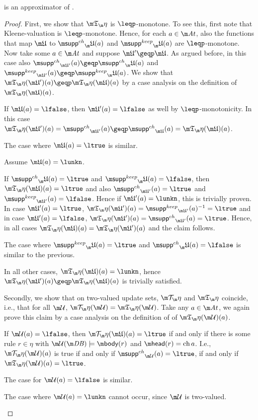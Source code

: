 \begin{proposition}
 \Ap is an approximator of \Op.
\end{proposition}
\begin{proof}
First, we show that $\Ap$ is $\leqp$-monotone. To see this, first note that Kleene-valuation is $\leqp$-monotone. Hence, for each $a\in \atoms$, also the functions that map $\UUU$ to $\suppin_\UUU(a)$ and $\suppout_\UUU(a)$ are $\leqp$-monotone. Now take some $a\in\atoms$ and suppose $\UUU'\geqp\UUU$. As argued before, in this case also $\suppin_{\UUU'}(a)\geqp \suppin_\UUU(a)$ and $\suppout_{\UUU'}(a)\geqp \suppout_\UUU(a)$. We show that $\Ap(\UUU')(a)\geqp \Ap(\UUU)(a)$ by a case analysis on the definition of $\Ap(\UUU)(a)$. 
\begin{compactitem}
\item If $\UUU(a)=\lfalse$, then $\UUU'(a)=\lfalse$ as well by $\leqp$-monotonicity. In this case $\Ap(\UUU')(a) = \suppin_{\UUU'}(a) \geqp \suppin_{\UUU}(a) =  \Ap(\UUU)(a)$. 
\item The case where $\UUU(a)=\ltrue$ is similar.
\item Assume $\UUU(a) = \lunkn$. 
\begin{compactitem}
\item If $\suppin_\UUU(a) = \ltrue$ and $\suppout_\UUU(a)=\lfalse$, then $\Ap(\UUU)(a)=\ltrue$ and also $\suppin_{\UUU'}(a) = \ltrue$ and $\suppout_{\UUU'}(a)=\lfalse$. Hence if $\UUU'(a)=\lunkn$, this is trivially proven. In case $\UUU'(a)=\ltrue$, $\Ap(\UUU')(a) = \suppout_{\UUU'}(a)^{-1}=\ltrue$ and in case $\UUU'(a)=\lfalse$, $\Ap(\UUU')(a)= \suppin_{\UUU'}(a)= \ltrue$. Hence, in all cases $\Ap(\UUU)(a) = \Ap(\UUU')(a)$ and the claim follows.
\item The case where $\suppout_\UUU(a)=\ltrue$ and $\suppin_\UUU(a) = \lfalse$ is similar to the previous.
\item In all other cases, $\Ap(\UUU)(a)=\lunkn$, hence $\Ap(\UUU')(a)\geqp \Ap(\UUU)(a)$ is trivially satisfied.
\end{compactitem}

\end{compactitem}

Secondly, we show that on two-valued update sets, $\Op$ and $\Ap$ coincide, i.e., that for all $\UU$, $\Op(\UU) =  \Ap(\UU)$. Take any $a \in \atoms$, we again prove this claim by a case analysis on the definition of of $\Ap(\UU)(a)$. 
\begin{compactitem}
 \item If $\UU(a)=\lfalse$, then $\Op(\UUU)(a)= \ltrue$ if and only if there is some rule $r\in \eta$ with $\UU(\db) \models \body(r)$ and $\head(r)=\change a$. I.e., $\Op(\UU)(a)$ is true if and only if $\suppin_{\UU}(a) = \ltrue$, if and only if $\Ap(\UU)(a)=\ltrue$. 
 \item The case for $\UU(a)=\lfalse$ is similar. 
 \item The case where $\UU(a)= \lunkn$ cannot occur, since $\UU$ is two-valued. \qedhere
\end{compactitem}

\end{proof}

